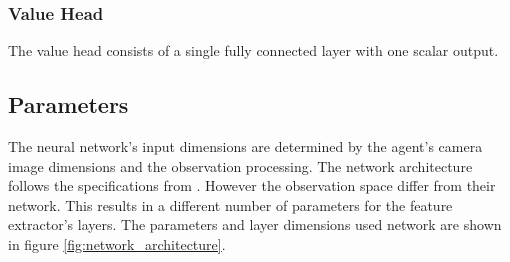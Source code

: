 \subsubsection{Value Head}

The value head consists of a single fully connected layer with one scalar output.


\subsection{Parameters}
The neural network's input dimensions are determined by the agent's camera image dimensions and the observation processing. The network architecture follows the specifications from \textcite{human_level_control}. However the observation space differ from their network. This results in a different number of parameters for the feature extractor's layers.
The parameters and layer dimensions used network are shown in figure \ref{fig:network_architecture}.





